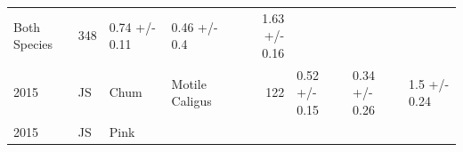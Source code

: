 \documentclass[fleqn,10pt]{wlpeerj} %
\begin{document}
\begin{longtable}[]{@{}llllrlll@{}}
\begin{minipage}[t]{0.11\columnwidth}
Both Species\strut
\end{minipage} & \begin{minipage}[t]{0.04\columnwidth}\raggedleft\strut
348\strut
\end{minipage} & \begin{minipage}[t]{0.14\columnwidth}\raggedright\strut
0.74 +/- 0.11\strut
\end{minipage} & \begin{minipage}[t]{0.14\columnwidth}\raggedright\strut
0.46 +/- 0.4\strut
\end{minipage} & \begin{minipage}[t]{0.14\columnwidth}\raggedright\strut
1.63 +/- 0.16\strut
\end{minipage}\tabularnewline
\begin{minipage}[t]{0.09\columnwidth}\raggedright\strut
2015\strut
\end{minipage} & \begin{minipage}[t]{0.06\columnwidth}\raggedright\strut
JS\strut
\end{minipage} & \begin{minipage}[t]{0.06\columnwidth}\raggedright\strut
Chum\strut
\end{minipage} & \begin{minipage}[t]{0.11\columnwidth}\raggedright\strut
Motile Caligus\strut
\end{minipage} & \begin{minipage}[t]{0.04\columnwidth}\raggedleft\strut
122\strut
\end{minipage} & \begin{minipage}[t]{0.14\columnwidth}\raggedright\strut
0.52 +/- 0.15\strut
\end{minipage} & \begin{minipage}[t]{0.14\columnwidth}\raggedright\strut
0.34 +/- 0.26\strut
\end{minipage} & \begin{minipage}[t]{0.14\columnwidth}\raggedright\strut
1.5 +/- 0.24\strut
\end{minipage}\tabularnewline
\begin{minipage}[t]{0.09\columnwidth}\raggedright\strut
2015\strut
\end{minipage} & \begin{minipage}[t]{0.06\columnwidth}\raggedright\strut
JS\strut
\end{minipage} & \begin{minipage}[t]{0.06\columnwidth}\raggedright\strut
Pink\strut
\end{minipage} & \begin{minipage}[t]{0.11\columnwidth}\raggedright\strut

\end{minipage}
\end{longtable}
\end{document}
